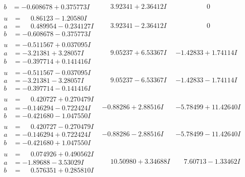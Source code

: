 \documentclass[1p]{elsarticle_modified}
\theoremstyle{definition}
\begin{document}
$$\begin{array}{c|c|c}
\begin{aligned}
b &= -0.608678 + 0.375773 I\end{aligned}
 & \phantom{-}3.92341 + 2.36412 I & \phantom{-0.000000 } 0 \\ \hline\begin{aligned}
u &= \phantom{-}0.86123 - 1.20580 I \\
a &= \phantom{-}0.489954 - 0.234127 I \\
b &= -0.608678 - 0.375773 I\end{aligned}
 & \phantom{-}3.92341 - 2.36412 I & \phantom{-0.000000 } 0 \\ \hline\begin{aligned}
u &= -0.511567 + 0.037095 I \\
a &= -3.21381 + 3.28057 I \\
b &= -0.397714 + 0.141416 I\end{aligned}
 & \phantom{-}9.05237 + 6.53367 I & -1.42833 + 1.74114 I \\ \hline\begin{aligned}
u &= -0.511567 - 0.037095 I \\
a &= -3.21381 - 3.28057 I \\
b &= -0.397714 - 0.141416 I\end{aligned}
 & \phantom{-}9.05237 - 6.53367 I & -1.42833 - 1.74114 I \\ \hline\begin{aligned}
u &= \phantom{-}0.420727 + 0.270479 I \\
a &= -0.146294 - 0.722424 I \\
b &= -0.421680 - 1.047550 I\end{aligned}
 & -0.88286 + 2.88516 I & -5.78499 + 11.42640 I \\ \hline\begin{aligned}
u &= \phantom{-}0.420727 - 0.270479 I \\
a &= -0.146294 + 0.722424 I \\
b &= -0.421680 + 1.047550 I\end{aligned}
 & -0.88286 - 2.88516 I & -5.78499 - 11.42640 I \\ \hline\begin{aligned}
u &= \phantom{-}0.074926 + 0.490562 I \\
a &= -1.89688 - 3.53029 I \\
b &= \phantom{-}0.576351 + 0.285810 I\end{aligned}
 & \phantom{-}10.50980 + 3.34688 I & \phantom{-}7.60713 - 1.33462 I \\ \hline\begin{aligned}

\end{aligned}
\end{array}$$
\end{document}
